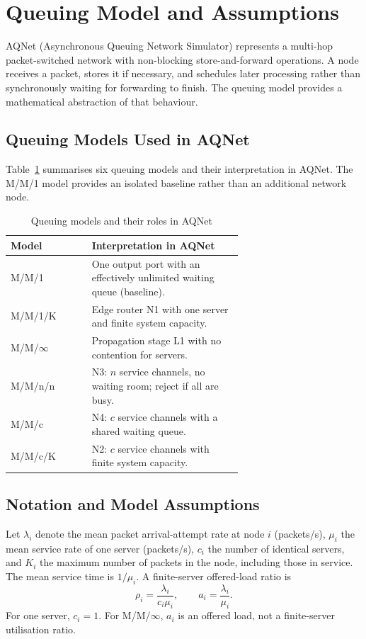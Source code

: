 \section{Queuing Model and Assumptions}
\label{sec:b1_queuing}

AQNet (Asynchronous Queuing Network Simulator) represents a multi-hop
packet-switched network with non-blocking store-and-forward operations.
A node receives a packet, stores it if necessary, and schedules later
processing rather than synchronously waiting for forwarding to finish.
The queuing model provides a mathematical abstraction of that behaviour.

\subsection{Queuing Models Used in AQNet}
Table~\ref{tab:b1_nodes} summarises six queuing models and their
interpretation in AQNet. The M/M/1 model provides an isolated
baseline rather than an additional network node.

\begin{table}[htbp]
\centering
\small
\caption{Queuing models and their roles in AQNet}
\label{tab:b1_nodes}
\begin{tabular}{@{}lp{0.65\linewidth}@{}}
\toprule
Model & Interpretation in AQNet \\
\midrule
M/M/1 & One output port with an effectively unlimited waiting queue (baseline). \\
M/M/1/K & Edge router N1 with one server and finite system capacity. \\
M/M/$\infty$ & Propagation stage L1 with no contention for servers. \\
M/M/n/n & N3: $n$ service channels, no waiting room; reject if all are busy. \\
M/M/c & N4: $c$ service channels with a shared waiting queue. \\
M/M/c/K & N2: $c$ service channels with finite system capacity. \\
\bottomrule
\end{tabular}
\end{table}

\subsection{Notation and Model Assumptions}
Let $\lambda_i$ denote the mean packet arrival-attempt rate at node $i$
(packets/s), $\mu_i$ the mean service rate of one server (packets/s),
$c_i$ the number of identical servers, and $K_i$ the maximum number
of packets in the node, including those in service. The mean service
time is $1/\mu_i$. A finite-server offered-load ratio is
\begin{equation}
\rho_i=\frac{\lambda_i}{c_i\mu_i},
\qquad a_i=\frac{\lambda_i}{\mu_i}.
\label{eq:b1_load}
\end{equation}
For one server, $c_i=1$. For M/M/$\infty$, $a_i$ is an offered load,
not a finite-server utilisation ratio.

